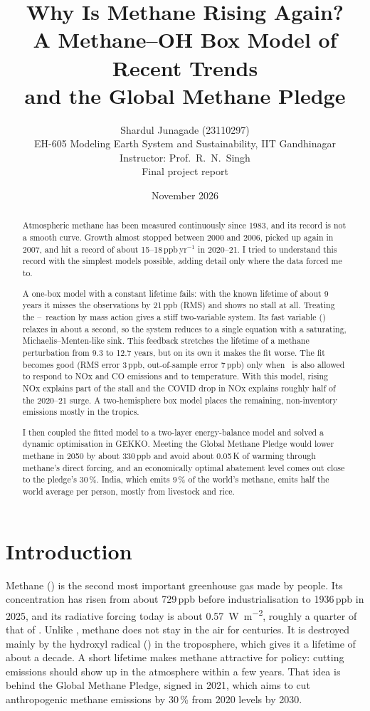 \documentclass[11pt,a4paper]{article}
\title{\textbf{Why Is Methane Rising Again?}\\[2pt]
\large A Methane--OH Box Model of Recent Trends\\ and the Global Methane Pledge}
\author{Shardul Junagade (23110297)\\[2pt]
\small EH-605 Modeling Earth System and Sustainability, IIT Gandhinagar\\
\small Instructor: Prof.\ R.\ N.\ Singh\\[2pt]
\small Final project report}
\date{November 2026}
\newcommand{\CH}{\ce{CH4}}
\newcommand{\OH}{\ce{OH}}
\begin{document}
\maketitle

\begin{abstract}
\noindent
Atmospheric methane has been measured continuously since 1983, and its record is not a smooth curve. Growth almost stopped between 2000 and 2006, picked up again in 2007, and hit a record of about 15--18\,ppb\,yr$^{-1}$ in 2020--21. I tried to understand this record with the simplest models possible, adding detail only where the data forced me to.

A one-box model with a constant lifetime fails: with the known lifetime of about 9 years it misses the observations by 21\,ppb (RMS) and shows no stall at all. Treating the \CH--\OH\ reaction by mass action gives a stiff two-variable system. Its fast variable (\OH) relaxes in about a second, so the system reduces to a single equation with a saturating, Michaelis--Menten-like sink. This feedback stretches the lifetime of a methane perturbation from 9.3 to 12.7 years, but on its own it makes the fit worse. The fit becomes good (RMS error 3\,ppb, out-of-sample error 7\,ppb) only when \OH\ is also allowed to respond to NOx and CO emissions and to temperature. With this model, rising NOx explains part of the stall and the COVID drop in NOx explains roughly half of the 2020--21 surge. A two-hemisphere box model places the remaining, non-inventory emissions mostly in the tropics.

I then coupled the fitted model to a two-layer energy-balance model and solved a dynamic optimisation in GEKKO. Meeting the Global Methane Pledge would lower methane in 2050 by about 330\,ppb and avoid about 0.05\,K of warming through methane's direct forcing, and an economically optimal abatement level comes out close to the pledge's 30\,\%. India, which emits 9\,\% of the world's methane, emits half the world average per person, mostly from livestock and rice.
\end{abstract}

\section{Introduction}

Methane (\CH) is the second most important greenhouse gas made by people. Its concentration has risen from about 729\,ppb before industrialisation to 1936\,ppb in 2025, and its radiative forcing today is about \SI{0.57}{W.m^{-2}}, roughly a quarter of that of . Unlike , methane does not stay in the air for centuries. It is destroyed mainly by the hydroxyl radical (\OH) in the troposphere, which gives it a lifetime of about a decade. A short lifetime makes methane attractive for policy: cutting emissions should show up in the atmosphere within a few years. That idea is behind the Global Methane Pledge, signed in 2021, which aims to cut anthropogenic methane emissions by 30\,\% from 2020 levels by 2030.
\end{document}
